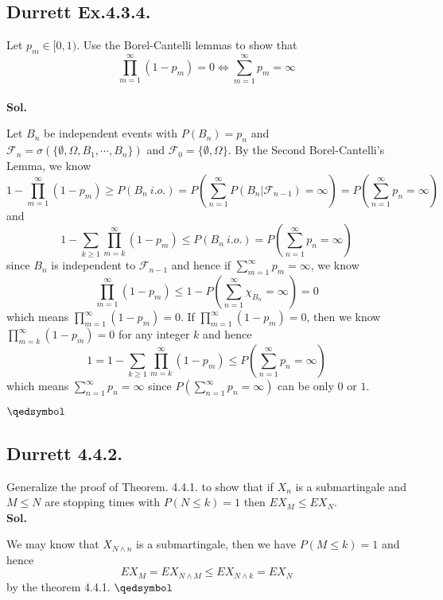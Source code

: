 \documentclass[lang=en,11pt,a4paper,citestyle =authoryear]{elegantpaper}
\newcommand{\prvd}{$\hfill \qedsymbol$}
\newcommand{\F}{\mathcal{F}}
\begin{document}
\subsection*{Durrett Ex.4.3.4.} 
Let $p_m \in [0, 1)$. Use the Borel-Cantelli lemmas to show that
\[
\prod_{m=1}^{\infty}(1-p_m) = 0\iff \sum\limits_{m=1}^{\infty}p_m = \infty
\]
\vspace{0.5em}\\
\textbf{Sol.} \par
Let $B_n$ be independent events with $P(B_n) = p_n$ and $\F_n = \sigma(\{\emptyset, \Omega,B_1,\cdots,B_n \})$ and $\F_0 = \{\emptyset,\Omega\}$. By the Second Borel-Cantelli's Lemma, we know
\[
1 - \prod_{m=1}^{\infty}(1-p_m) \geq P(B_n\ i.o.) = P(\sum\limits_{n=1}^{\infty} P(B_n|\F_{n-1}) = \infty) = P(\sum\limits_{n=1}^{\infty} p_n = \infty)
\]
and
\[
1 - \sum\limits_{k\geq 1}\prod_{m=k}^{\infty}(1-p_m) \leq P(B_n\ i.o.) = P(\sum\limits_{n=1}^{\infty} p_n = \infty)
\]
since $B_n$ is independent to $\F_{n-1}$ and hence if $\sum\limits_{m=1}^{\infty} p_m = \infty$, we know
\[
\prod_{m=1}^{\infty}(1-p_m) \leq 1 - P(\sum\limits_{n=1}^{\infty} \chi_{B_n} = \infty) = 0
\]
which means $\prod_{m=1}^{\infty}(1-p_m) = 0$. If $\prod_{m=1}^{\infty}(1-p_m) = 0$, then we know $\prod_{m=k}^{\infty}(1-p_m) = 0$ for any integer $k$ and hence
\[1 = 1 - \sum\limits_{k\geq 1}\prod_{m=k}^{\infty}(1-p_m) \leq  P(\sum\limits_{n=1}^{\infty} p_n = \infty)\]
which means $\sum\limits_{n=1}^{\infty} p_n = \infty$ since $P(\sum\limits_{n=1}^{\infty} p_n = \infty)$ can be only $0$ or $1$.

\prvd
\vspace{0.5em}

\subsection*{Durrett 4.4.2.} 
Generalize the proof of Theorem. 4.4.1. to show that if $X_n$ is a submartingale and $M\leq N$ are stopping times with $P(N\leq k) = 1$ then $EX_M \leq EX_N$.
\vspace{0.5em}\\
\textbf{Sol.} \par
We may know that $X_{N\wedge n}$ is a submartingale, then we have $P(M\leq k) = 1$ and hence
\[EX_M = EX_{N\wedge M} \leq EX_{N\wedge k} = EX_{N}\]
by the theorem 4.4.1.
\prvd
\vspace{0.5em}
\end{document}
